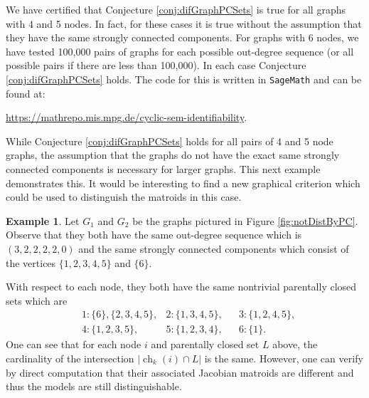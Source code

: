 \documentclass[12pt,reqno]{amsart}
\theoremstyle{plain}
\theoremstyle{definition}
\newtheorem{example}[theorem]{Example}
\DeclareMathOperator{\ch}{ch}
\begin{document}
We have certified that Conjecture \ref{conj:difGraphPCSets} is true for all graphs with 4 and 5 nodes. In fact, for these cases it is true without the assumption that they have the same strongly connected components. For graphs with 6 nodes, we have tested 100,000 pairs of graphs for each possible out-degree sequence (or all possible pairs if there are less than 100,000). In each case Conjecture \ref{conj:difGraphPCSets} holds. The code for this is written in \texttt{SageMath} and can be found at:

\begin{center}
        \url{https://mathrepo.mis.mpg.de/cyclic-sem-identifiability}.
\end{center}

While Conjecture \ref{conj:difGraphPCSets} holds for all pairs of 4 and 5 node graphs, the assumption that the graphs do not have the exact same strongly connected components is necessary for larger graphs. This next example demonstrates this. It would be interesting to find a new graphical criterion which could be used to distinguish the matroids in this case. 

\begin{example}
Let $G_1$ and $G_2$ be the graphs pictured in Figure \ref{fig:notDistByPC}. Observe that they both have the same out-degree sequence which is $(3,2,2,2,2,0)$ and the same strongly connected components which consist of the vertices $\{1,2,3,4,5\}$ and $\{6\}$. 

With respect to each node, they both have the same nontrivial parentally closed sets which are
\begin{align*}
&1: \{6\}, \{2,3,4,5\}, &2: \{1,3,4,5\}, & &3: \{1,2,4,5\}, \\
&4: \{1,2,3,5\},  &5: \{1,2,3,4\}, & &6: \{1\}.
\end{align*}
One can see that for each node $i$ and parentally closed set $L$ above, the cardinality of the intersection $|\ch_k(i) \cap L|$ is the same. However, one can verify by direct computation that their associated Jacobian matroids are different and thus the models are still distinguishable. 
\end{example}
\end{document}
